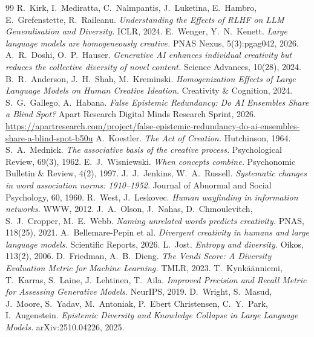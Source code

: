 \documentclass[11pt]{article}
\begin{document}

\begin{thebibliography}{99}
\small
{} R.\ Kirk, I.\ Mediratta, C.\ Nalmpantis, J.\ Luketina, E.\ Hambro, E.\ Grefenstette, R.\ Raileanu. \emph{Understanding the Effects of RLHF on LLM Generalisation and Diversity.} ICLR, 2024.
 E.\ Wenger, Y.\ N.\ Kenett. \emph{Large language models are homogeneously creative.} PNAS Nexus, 5(3):pgag042, 2026.
 A.\ R.\ Doshi, O.\ P.\ Hauser. \emph{Generative AI enhances individual creativity but reduces the collective diversity of novel content.} Science Advances, 10(28), 2024.
 B.\ R.\ Anderson, J.\ H.\ Shah, M.\ Kreminski. \emph{Homogenization Effects of Large Language Models on Human Creative Ideation.} Creativity \& Cognition, 2024.
 S.\ G.\ Gallego, A.\ Habana. \emph{False Epistemic Redundancy: Do AI Ensembles Share a Blind Spot?} Apart Research Digital Minds Research Sprint, 2026. \url{https://apartresearch.com/project/false-epistemic-redundancy-do-ai-ensembles-share-a-blind-spot-b50u}
 A.\ Koestler. \emph{The Act of Creation.} Hutchinson, 1964.
 S.\ A.\ Mednick. \emph{The associative basis of the creative process.} Psychological Review, 69(3), 1962.
 E.\ J.\ Wisniewski. \emph{When concepts combine.} Psychonomic Bulletin \& Review, 4(2), 1997.
 J.\ J.\ Jenkins, W.\ A.\ Russell. \emph{Systematic changes in word association norms: 1910--1952.} Journal of Abnormal and Social Psychology, 60, 1960.
 R.\ West, J.\ Leskovec. \emph{Human wayfinding in information networks.} WWW, 2012.
 J.\ A.\ Olson, J.\ Nahas, D.\ Chmoulevitch, S.\ J.\ Cropper, M.\ E.\ Webb. \emph{Naming unrelated words predicts creativity.} PNAS, 118(25), 2021.
 A.\ Bellemare-Pepin et al. \emph{Divergent creativity in humans and large language models.} Scientific Reports, 2026.
 L.\ Jost. \emph{Entropy and diversity.} Oikos, 113(2), 2006.
 D.\ Friedman, A.\ B.\ Dieng. \emph{The Vendi Score: A Diversity Evaluation Metric for Machine Learning.} TMLR, 2023.
 T.\ Kynkäänniemi, T.\ Karras, S.\ Laine, J.\ Lehtinen, T.\ Aila. \emph{Improved Precision and Recall Metric for Assessing Generative Models.} NeurIPS, 2019.
 D.\ Wright, S.\ Masud, J.\ Moore, S.\ Yadav, M.\ Antoniak, P.\ Ebert Christensen, C.\ Y.\ Park, I.\ Augenstein. \emph{Epistemic Diversity and Knowledge Collapse in Large Language Models.} arXiv:2510.04226, 2025.

\end{thebibliography}
\end{document}
